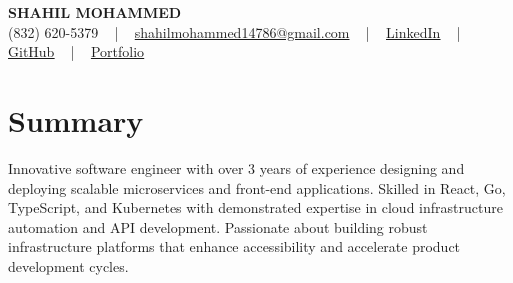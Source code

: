 \documentclass[letterpaper,10pt]{article}
\begin{document}
\begin{center}
    {\fontsize{14pt}{12pt}\selectfont \textbf{\MakeUppercase{Shahil Mohammed}}}\\ \vspace{2pt}
    \fontsize{10pt}{12pt}\selectfont (832) 620-5379 ~ | ~ \href{mailto:shahilmohammed14786@gmail.com}{shahilmohammed14786@gmail.com} ~ | ~  
    \href{https://www.linkedin.com/in/shahil-mohammed-9652931a1/}{\color{blue}\underline{LinkedIn}}  ~ | ~ 
    \href{https://github.com/freakbeast14}{\color{blue}\underline{GitHub}} ~ | ~ 
    \href{https://shahil-mohammed.netlify.app/}{\color{blue}\underline{Portfolio}}
    \vspace{-8pt}
\end{center}

\section{Summary}
\vspace{-2pt}\fontsize{8pt}{9pt}\selectfont
Innovative software engineer with over 3 years of experience designing and deploying scalable microservices and front-end applications. Skilled in React, Go, TypeScript, and Kubernetes with demonstrated expertise in cloud infrastructure automation and API development. Passionate about building robust infrastructure platforms that enhance accessibility and accelerate product development cycles.
 \vspace{-5pt}
 
\vspace{-2pt}
\end{document}
